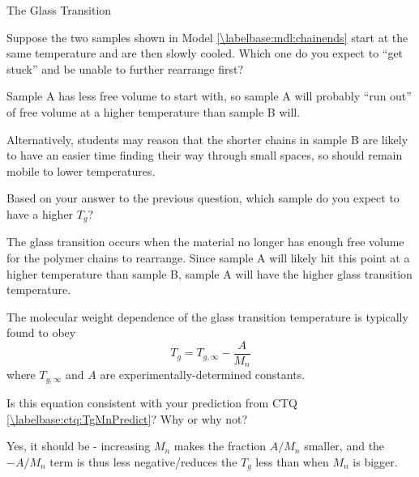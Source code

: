 \begin{activity}{The Glass Transition}
\begin{ctqs}
	\question Suppose the two samples shown in Model \ref{\labelbase:mdl:chainends} start at the same temperature and are then slowly cooled.  Which one do you expect to ``get stuck'' and be unable to further rearrange first? 
	
		\begin{solution}[0.75in]
			Sample A has less free volume to start with, so sample A will probably ``run out'' of free volume at a higher temperature than sample B will.
			
			Alternatively, students may reason that the shorter chains in sample B are likely to have an easier time finding their way through small spaces, so should remain mobile to lower temperatures.
		\end{solution}
		
	\question Based on your answer to the previous question, which sample do you expect to have a higher $T_g$?
		 \label{\labelbase:ctq:TgMnPredict}
	
		\begin{solution}[0.75in]
			The glass transition occurs when the material no longer has enough free volume for the polymer chains to rearrange.  Since sample A will likely hit this point at a higher temperature than sample B, sample A will have the higher glass transition temperature.
		\end{solution}
	
\end{ctqs}

\begin{infobox}

	The molecular weight dependence of the glass transition temperature is typically found to obey
	\begin{equation*}
		T_g = T_{g,\infty} - \frac{A}{M_n}\label{\labelbase:eqn:Mn}
	\end{equation*}
	where $T_{g,\infty}$ and $A$ are experimentally-determined constants.
\end{infobox}

\begin{ctqs}
	\question Is this equation consistent with your prediction from CTQ \ref{\labelbase:ctq:TgMnPredict}? Why or why not?
	
		\begin{solution}[1in]
			Yes, it should be - increasing $M_n$ makes the fraction $A/M_n$ smaller, and the $-A/M_n$ term is thus less negative/reduces the $T_g$ less than when $M_n$ is bigger.
		\end{solution}
	

\end{ctqs}
\end{activity}
